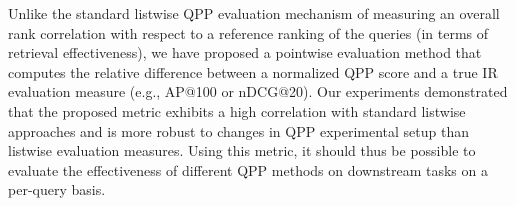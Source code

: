 Unlike the standard listwise QPP evaluation mechanism of measuring an overall rank correlation with respect to a reference ranking of the queries (in terms of retrieval effectiveness), we have proposed a pointwise evaluation method that computes the relative difference between a normalized QPP score and a true IR evaluation measure (e.g., AP@100 or nDCG@20). Our experiments demonstrated that the proposed metric exhibits a high correlation with  standard listwise approaches and is more robust to changes in  QPP experimental setup than listwise evaluation measures. Using this metric, it should thus be possible to evaluate the effectiveness of different QPP methods on downstream tasks on a per-query basis.